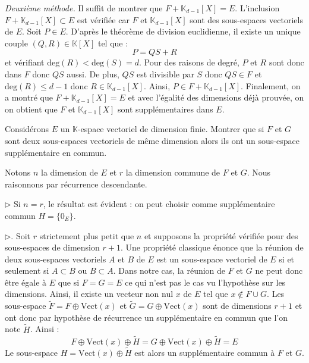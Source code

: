 \documentclass[a4paper,10pt]{report}
\begin{document}
\begin{enumerate}
\noindent \textit{Deuxième méthode.}  Il suffit de montrer que $F + \mathbb{K}_{d-1}[X]=E$. L'inclusion  $ F + \mathbb{K}_{d-1}[X] \subset E$ est vérifiée car $F$ et $\mathbb{K}_{d-1}[X]$ sont des sous-espaces vectoriels de $E$. Soit $P \in E$. D'après le théorème de division euclidienne, il existe un unique couple $(Q,R) \in \mathbb{K}[X]$ tel que :
$$ P = QS+R$$
et vérifiant $\textrm{deg}(R) < \textrm{deg}(S) = d$. Pour des raisons de degré, $P$ et $R$ sont donc dans $F$ donc $QS$ aussi. De plus, $QS$ est divisible par $S$ donc $QS \in F$ et $\textrm{deg}(R) \leq d-1$ donc $R \in \mathbb{K}_{d-1}[X]$. Ainsi, $P \in F + \mathbb{K}_{d-1}[X]$. Finalement, on a montré que $F + \mathbb{K}_{d-1}[X]=E$ et avec l'égalité des dimensions déjà prouvée, on on obtient que $F$ et $\mathbb{K}_{d-1}[X]$ sont supplémentaires dans $E$.
\end{enumerate}


\begin{Exercice}{} Considérons $E$ un $\mathbb{K}$-espace vectoriel de dimension finie. Montrer que si $F$ et $G$ sont deux sous-espaces vectoriels de même dimension alors ils ont un sous-espace supplémentaire en commun.
\end{Exercice}

\corr Notons $n$ la dimension de $E$ et $r$ la dimension commune de $F$ et $G$. Nous raisonnons par récurrence descendante.

\medskip

\noindent $\rhd$ Si $n=r$, le résultat est évident : on peut choisir comme supplémentaire commun $H = \lbrace 0_E \rbrace$.

\medskip

\noindent $\rhd$. Soit $r$ strictement plus petit que $n$ et supposons la propriété vérifiée pour des sous-espaces de dimension $r+1$. Une propriété classique énonce que la réunion de deux sous-espaces vectoriels $A$ et $B$ de $E$ est un sous-espace vectoriel de $E$ si et seulement si $A \subset B$ ou $B \subset A$. Dans notre cas, la réunion de $F$ et $G$ ne peut donc être égale à $E$ que si $F=G=E$ ce qui n'est pas le cas vu l'hypothèse sur les dimensions. Ainsi, il existe un vecteur non nul $x$ de $E$ tel que $x \notin F \cup G$. Les sous-espace $\tilde{F}= F \oplus \textrm{Vect}(x)$ et $\tilde{G}= G \oplus \textrm{Vect}(x)$ sont de dimensions $r+1$ et ont donc par hypothèse de récurrence un supplémentaire en commun que l'on note $\tilde{H}$. Ainsi :
$$  F \oplus \textrm{Vect}(x) \oplus \tilde{H} =  G \oplus \textrm{Vect}(x) \oplus \tilde{H} = E$$
Le sous-espace $H=\textrm{Vect}(x) \oplus \tilde{H}$ est alors un supplémentaire commun à $F$ et $G$.
\end{document}
